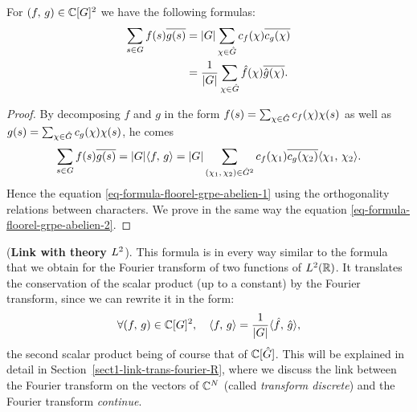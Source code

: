 \begin{prop}
\label{prop-formula-floorel}
 For $ (f, \, g) \in \mathbb{C}[G]^2 $ we have the following formulas:
\begin{align}
\label{eq-formula-floorel-grpe-abelien-1}
\sum_{s \in G}{f (s) \overline{g (s)}} & = |G|\sum_{\chi \in \hat{G}}{c_{f}(\chi) \overline{c_{g}(\chi)}} \\
\label{eq-formula-floorel-grpe-abelien-2}
& = \frac{1}{|G|} \sum_{\chi \in \hat{G}}{\hat{f}(\chi) \overline{\hat{g}(\chi)}}.
\end{align}

\end{prop}
\begin{proof}
By decomposing $f$ and $g$ in the form $f(s) = \sum_{\chi \in \hat{G}}{c_{f}(\chi) \chi(s)}$ as well as $g(s) = \sum_{\chi \in \hat{G}}{c_{g}(\chi) \chi(s)}$, he comes
\begin{equation*}
\sum_{s \in G}{f (s) \overline{g (s)}} = |G|\langle f,\,g\rangle = |G|\sum_{(\chi_1, \, \chi_2) \in \hat{G}^2}{c_{f}(\chi_1) \overline{c_{g}(\chi_2)} \langle \chi_1,\,\chi_2\rangle}.
\end{equation*}
Hence the equation \eqref{eq-formula-floorel-grpe-abelien-1} using the orthogonality relations between characters. We prove in the same way the equation \eqref{eq-formula-floorel-grpe-abelien-2}.
\end{proof}


\begin{rem}{(\upshape \textbf{Link with theory $L^2$}).}
This formula is in every way similar to the formula that we obtain for the Fourier transform of two functions of $L^2(\mathbb{R})$. It translates the conservation of the scalar product (up to a constant) by the Fourier transform, since we can rewrite it in the form:
\begin{equation*}
\forall (f, \, g) \in \mathbb{C}[G]^2, \quad \langle f,\,g\rangle = \frac{1}{|G|} \langle \hat{f},\,\hat{g}\rangle,
\end{equation*}
the second scalar product being of course that of $\mathbb{C}[\hat{G}]$. This will be explained in detail in Section~\ref{sect1-link-trans-fourier-R}, where we discuss the link between the Fourier transform on the vectors of $\mathbb{C}^N $ (called \textit{transform discrete}) and the Fourier transform \textit{continue}.
\end{rem}

